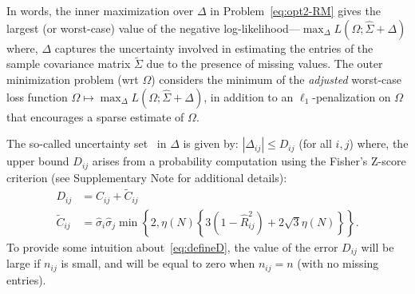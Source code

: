In words, the inner maximization over $\Delta$ in Problem~\eqref{eq:opt2-RM} gives the largest (or worst-case) value of the negative log-likelihood---$\max_{\Delta} L(\Omega; \hat{\Sigma} + \Delta)$
where, $\Delta$ captures the uncertainty involved in estimating the entries of the sample covariance matrix $\tilde{\Sigma}$ due to the presence of missing values. 
The outer minimization problem (wrt $\Omega$) considers the minimum of the \emph{adjusted} worst-case loss function  $\Omega \mapsto \max_{\Delta} L(\Omega; \hat{\Sigma} + \Delta)$, in addition to an $\ell_{1}$-penalization on $\Omega$ that encourages a 
sparse estimate of $\Omega$.

The so-called uncertainty set~\cite{bertsimas2011theory} in $\Delta$ is given by: $|\Delta_{ij}| \leq D_{ij}$ (for all $i,j$)
where, the upper bound $D_{ij}$ arises from a probability computation using the Fisher's Z-score criterion (see Supplementary Note for additional details):
\begin{equation}\label{eq:defineD}
\begin{aligned}
    D_{ij} & = C_{ij} + \tilde{C}_{ij} \\
    \tilde{C}_{ij} & = \hat{\sigma}_{i} \hat{\sigma}_{j} \min \left \{2,  \eta (N) \left \{ 3 (1 - \hat{R}^2_{ij}) + 2 \sqrt{3} \eta (N) \right \} \right \}.
\end{aligned}
\end{equation}
To provide some intuition about~\eqref{eq:defineD}, the value of the error $D_{ij}$ will be large if $n_{ij}$ is small, and will be equal to zero when $n_{ij}=n$ (with no missing entries). 

